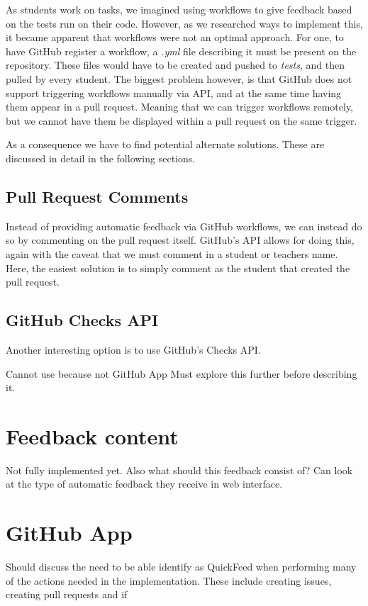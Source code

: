 As students work on tasks, we imagined using workflows to give feedback based on the tests run on their code. %
However, as we researched ways to implement this, it became apparent that workflows were not an optimal approach.
For one, to have GitHub register a workflow, a \textit{.yml} file describing it must be present on the repository.
These files would have to be created and pushed to \textit{tests}, and then pulled by every student.
The biggest problem however, is that GitHub does not support triggering workflows manually via API, and at the same time having them appear in a pull request.
Meaning that we can trigger workflows remotely, but we cannot have them be displayed within a pull request on the same trigger.

As a consequence we have to find potential alternate solutions.
These are discussed in detail in the following sections.

\subsection{Pull Request Comments}

Instead of providing automatic feedback via GitHub workflows, we can instead do so by commenting on the pull request itself.
GitHub's API allows for doing this, again with the caveat that we must comment in a student or teachers name.
Here, the easiest solution is to simply comment as the student that created the pull request.

\subsection{GitHub Checks API}

Another interesting option is to use GitHub's Checks API.

Cannot use because not GitHub App
Must explore this further before describing it.

\section{Feedback content}

Not fully implemented yet.
Also what should this feedback consist of? Can look at the type of automatic feedback they receive in web interface.

\section{GitHub App}

Should discuss the need to be able identify as QuickFeed when performing many of the actions needed in the implementation.
These include creating issues, creating pull requests and if 